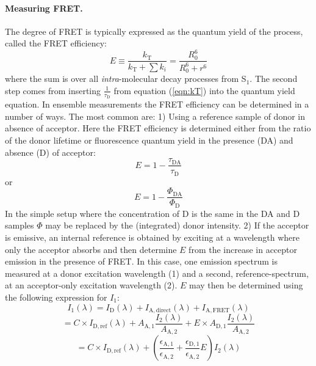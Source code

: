  \paragraph{Measuring FRET.} The degree of FRET is typically expressed as the quantum yield of the process, called the FRET efficiency:
\begin{equation}
 E \equiv \frac{k_\mathrm{T}}{k_\mathrm{T} + \sum k_{i}}
  = \frac{R_0^6}{R_0^6 + r^6}
 \label{eqn:Eff 1}
\end{equation}
 where the sum is over all \emph{intra}-molecular decay processes from S$_1$. The second step comes from inserting $\frac{1}{\tau_\mathrm{D}}$ from equation (\ref{eqn:kT}) into the quantum yield equation.
 In ensemble measurements the FRET efficiency can be determined in a number of ways.\cite{Clegg1992} The most common are: 1) Using a reference sample of donor in absence of acceptor. Here the FRET efficiency is determined either from the ratio of the donor lifetime or fluorescence quantum yield in the presence (DA) and absence (D) of acceptor:
\begin{equation}
 E = 1 - \frac{\tau_{\mathrm{DA}}}{\tau_\mathrm{D}}
 \label{eqn:1-Eff A}
\end{equation}
 or
\begin{equation}
 E = 1 - \frac{\Phi_{\mathrm{DA}}}{\Phi_\mathrm{D}}
 \label{eqn:1-Eff B}
\end{equation}
 In the simple setup where the concentration of D is the same in the DA and D samples $\Phi$ may be replaced by the (integrated) donor intensity. 2) If the acceptor is emissive, an internal reference is obtained by exciting at a wavelength where only the acceptor absorbs and then determine $E$ from the increase in acceptor emission in the presence of FRET. In this case, one emission spectrum is measured at a donor excitation wavelength (1) and a second, reference-spectrum, at an acceptor-only excitation wavelength (2). $E$ may then be determined using the following expression for $I_1$:
\[
 I_1(\lambda) = I_\mathrm{D}(\lambda) + I_\mathrm{A,direct}(\lambda) + I_\mathrm{A,FRET}(\lambda)
\]
\[
 = C\times I_\mathrm{D,ref}(\lambda) + A_\mathrm{A,1}\frac{I_2(\lambda)}{A_\mathrm{A,2}} + E\times A_\mathrm{D,1}\frac{I_2(\lambda)}{A_\mathrm{A,2}}
\]
\begin{equation}
 = C\times I_\mathrm{D,ref}(\lambda) + \left( \frac{\epsilon_\mathrm{A,1}}{\epsilon_\mathrm{A,2}} + \frac{\epsilon_\mathrm{D,1}}{\epsilon_\mathrm{A,2}}E\right)I_2(\lambda)
 \label{eq:FRETmeas2}
\end{equation}
